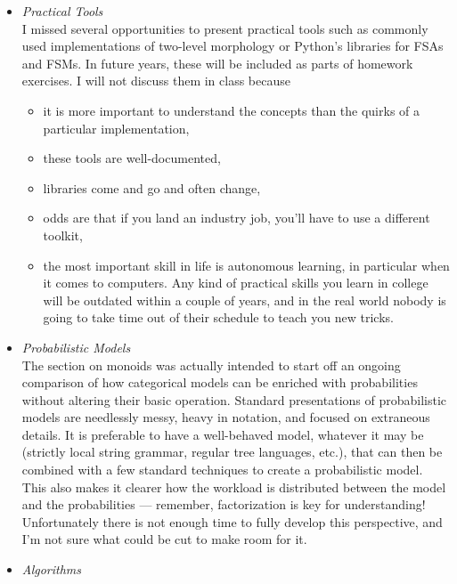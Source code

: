 \begin{itemize}
    \item \emph{Practical Tools}\\
        I missed several opportunities to present practical tools such as commonly used implementations of two-level morphology or Python's libraries for FSAs and FSMs.
        In future years, these will be included as parts of homework exercises.
        I will not discuss them in class because
            \begin{itemize}
                \item it is more important to understand the concepts than the quirks of a particular implementation,
                \item these tools are well-documented,
                \item libraries come and go and often change,
                \item odds are that if you land an industry job, you'll have to use a different toolkit,
                \item the most important skill in life is autonomous learning, in particular when it comes to computers.
                    Any kind of practical skills you learn in college will be outdated within a couple of years, and in the real world nobody is going to take time out of their schedule to teach you new tricks.
            \end{itemize}
    \item \emph{Probabilistic Models}\\
        The section on monoids was actually intended to start off an ongoing comparison of how categorical models can be enriched with probabilities without altering their basic operation.
        Standard presentations of probabilistic models are needlessly messy, heavy in notation, and focused on extraneous details.
        It is preferable to have a well-behaved model, whatever it may be (strictly local string grammar, regular tree languages, etc.), that can then be combined with a few standard techniques to create a probabilistic model.
        This also makes it clearer how the workload is distributed between the model and the probabilities --- remember, factorization is key for understanding!
        Unfortunately there is not enough time to fully develop this perspective, and I'm not sure what could be cut to make room for it.
    \item \emph{Algorithms}\\

\end{itemize}
